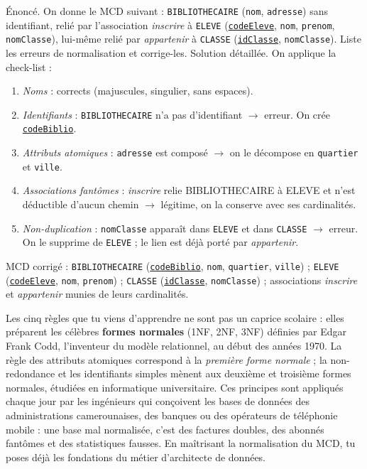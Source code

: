 \documentclass[11pt]{article}
\begin{document}
\begin{exoresolu}
Énoncé. On donne le MCD suivant : \texttt{BIBLIOTHECAIRE} (\texttt{nom}, \texttt{adresse}) sans identifiant, relié par l'association \emph{inscrire} à \texttt{ELEVE} (\underline{\texttt{codeEleve}}, \texttt{nom}, \texttt{prenom}, \texttt{nomClasse}), lui-même relié par \emph{appartenir} à \texttt{CLASSE} (\underline{\texttt{idClasse}}, \texttt{nomClasse}). Liste les erreurs de normalisation et corrige-les.
\tcblower
Solution détaillée. On applique la check-list :
\begin{enumerate}
  \item \emph{Noms} : corrects (majuscules, singulier, sans espaces).
  \item \emph{Identifiants} : \texttt{BIBLIOTHECAIRE} n'a pas d'identifiant $\rightarrow$ erreur. On crée \underline{\texttt{codeBiblio}}.
  \item \emph{Attributs atomiques} : \texttt{adresse} est composé $\rightarrow$ on le décompose en \texttt{quartier} et \texttt{ville}.
  \item \emph{Associations fantômes} : \emph{inscrire} relie BIBLIOTHECAIRE à ELEVE et n'est déductible d'aucun chemin $\rightarrow$ légitime, on la conserve avec ses cardinalités.
  \item \emph{Non-duplication} : \texttt{nomClasse} apparaît dans \texttt{ELEVE} et dans \texttt{CLASSE} $\rightarrow$ erreur. On le supprime de \texttt{ELEVE} ; le lien est déjà porté par \emph{appartenir}.
\end{enumerate}
MCD corrigé : \texttt{BIBLIOTHECAIRE} (\underline{\texttt{codeBiblio}}, \texttt{nom}, \texttt{quartier}, \texttt{ville}) ; \texttt{ELEVE} (\underline{\texttt{codeEleve}}, \texttt{nom}, \texttt{prenom}) ; \texttt{CLASSE} (\underline{\texttt{idClasse}}, \texttt{nomClasse}) ; associations \emph{inscrire} et \emph{appartenir} munies de leurs cardinalités.
\end{exoresolu}

\begin{savaistu}
Les cinq règles que tu viens d'apprendre ne sont pas un caprice scolaire : elles préparent les célèbres \textbf{formes normales} (1NF, 2NF, 3NF) définies par Edgar Frank Codd, l'inventeur du modèle relationnel, au début des années 1970. La règle des attributs atomiques correspond à la \emph{première forme normale} ; la non-redondance et les identifiants simples mènent aux deuxième et troisième formes normales, étudiées en informatique universitaire. Ces principes sont appliqués chaque jour par les ingénieurs qui conçoivent les bases de données des administrations camerounaises, des banques ou des opérateurs de téléphonie mobile : une base mal normalisée, c'est des factures doubles, des abonnés fantômes et des statistiques fausses. En maîtrisant la normalisation du MCD, tu poses déjà les fondations du métier d'architecte de données.
\end{savaistu}
\end{document}
